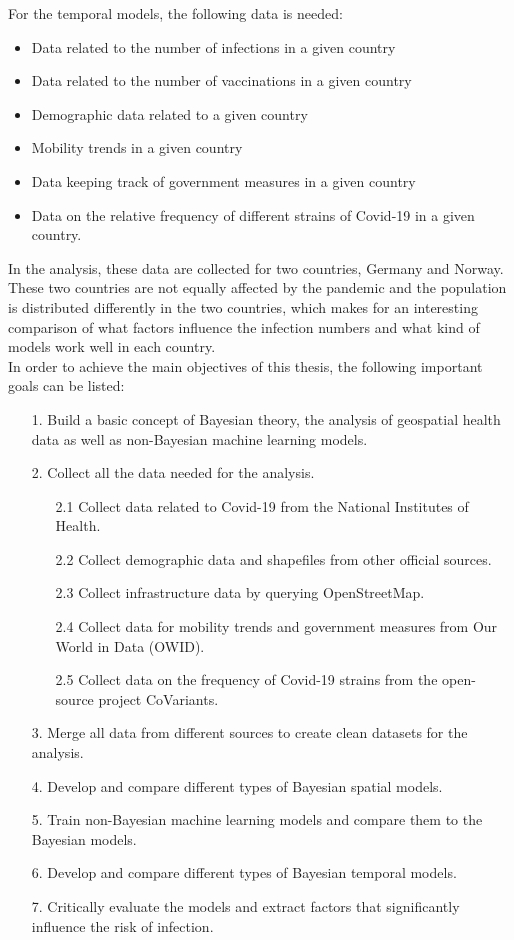 For the temporal models, the following data is needed:
\begin{itemize}
    \item Data related to the number of infections in a given country
    \item Data related to the number of vaccinations in a given country
    \item Demographic data related to a given country
    \item Mobility trends in a given country
    \item Data keeping track of government measures in a given country
    \item Data on the relative frequency of different strains of Covid-19 in a given country.
\end{itemize}
In the analysis, these data are collected for two countries, Germany and Norway. These two countries are not equally affected by the pandemic and the population is distributed differently in the two countries, which makes for an interesting comparison of what factors influence the infection numbers and what kind of models work well in each country.\\
In order to achieve the main objectives of this thesis, the following important goals can be listed:
\begin{itemize}
    \item[1.] Build a basic concept of Bayesian theory, the analysis of geospatial health data as well as non-Bayesian machine learning models.
    \item[2.] Collect all the data needed for the analysis.
    \begin{itemize}
    \item[2.1] Collect data related to Covid-19 from the National Institutes of Health.
    \item[2.2] Collect demographic data and shapefiles from other official sources.
    \item[2.3] Collect infrastructure data by querying OpenStreetMap.
    \item[2.4] Collect data for mobility trends and government measures from Our World in Data (OWID).
    \item[2.5] Collect data on the frequency of Covid-19 strains from the open-source project CoVariants.
    \end{itemize}
    \item[3.] Merge all data from different sources to create clean datasets for the analysis.
    \item[4.] Develop and compare different types of Bayesian spatial models.
    \item[5.] Train non-Bayesian machine learning models and compare them to the Bayesian models.
    \item[6.] Develop and compare different types of Bayesian temporal models.
    \item[7.] Critically evaluate the models and extract factors that significantly influence the risk of infection.
\end{itemize}
\clearpage

